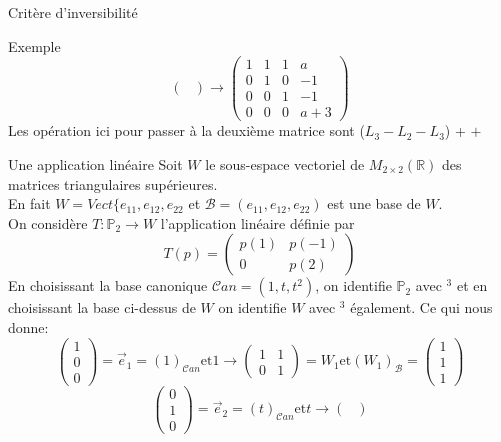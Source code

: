 \begin{parag}{Critère d'inversibilité}
\begin{subparag}{Exemple}
\[\begin{pmatrix}
         \end{pmatrix} \to \begin{pmatrix}
            1 & 1 & 1 & a\\
             0 & 1 & 0 & -1\\
             0 & 0 & 1 & -1\\
             0 & 0 & 0 & a + 3
             
         \end{pmatrix}\]
         Les opération ici pour passer à la deuxième matrice sont ($L_3 - L_2 - L_3$) + $+$
     \end{subparag}
 \end{parag}

 \begin{parag}{Une application linéaire}
     Soit $W$ le sous-espace vectoriel de $M_{2\times2}\left(\mathbb{R}\right)$ des matrices triangulaires supérieures.
     \\
     En fait $W = Vect\{e_{11}, e_{12}, e_{22}$ et $\mathcal{B} = (e_{11}, e_{12}, e_{22})$ est une base de $W$.
     \\
     On considère $T : \mathbb{P}_2 \to W$ l'application linéaire définie par
     \[T\left(p\right) = \begin{pmatrix}
         p\left(1\right) & p\left(-1\right) \\
         0 & p\left(2\right)
     \end{pmatrix}\]
     En choisissant la base canonique $\mathcal{C}an = \left(1, t, t^2\right)$, on identifie $\mathbb{P}_2$ avec \R$^3$ et en choisissant la base ci-dessus de $W$ on identifie $W$ avec \R$^3$ également. Ce qui nous donne:
     \[\begin{pmatrix}
         1 \\ 0 \\ 0
     \end{pmatrix} = \vec{e}_1 = \left(1\right)_{\mathcal{C}an} \text{et} 1 \to \begin{pmatrix}
         1 & 1 \\ 0 & 1
     \end{pmatrix} = W_1 \text{et} \left(W_1\right)_{\mathcal{B}} = \begin{pmatrix}
         1 \\ 1 \\ 1
     \end{pmatrix}\]
     \[\begin{pmatrix}
         0 \\ 1 \\ 0
     \end{pmatrix} = \vec{e}_2 = \left(t\right)_{\mathcal{C}an} \text{et} t \to \begin{pmatrix}

\end{pmatrix}\]
\end{parag}
